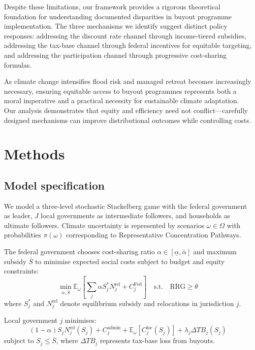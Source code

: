 \documentclass[11pt,letterpaper]{article}
\theoremstyle{definition}
\newcommand{\E}{\mathbb{E}}
\begin{document}
Despite these limitations, our framework provides a rigorous theoretical foundation for understanding documented disparities in buyout programme implementation. The three mechanisms we identify suggest distinct policy responses: addressing the discount rate channel through income-tiered subsidies, addressing the tax-base channel through federal incentives for equitable targeting, and addressing the participation channel through progressive cost-sharing formulas.

As climate change intensifies flood risk and managed retreat becomes increasingly necessary, ensuring equitable access to buyout programmes represents both a moral imperative and a practical necessity for sustainable climate adaptation. Our analysis demonstrates that equity and efficiency need not conflict---carefully designed mechanisms can improve distributional outcomes while controlling costs.

\section*{Methods}

\subsection*{Model specification}

We model a three-level stochastic Stackelberg game with the federal government as leader, $J$ local governments as intermediate followers, and households as ultimate followers. Climate uncertainty is represented by scenarios $\omega \in \Omega$ with probabilities $\pi(\omega)$ corresponding to Representative Concentration Pathways.

The federal government chooses cost-sharing ratio $\alpha \in [\underline{\alpha}, \bar{\alpha}]$ and maximum subsidy $\bar{S}$ to minimise expected social costs subject to budget and equity constraints:
\begin{equation}
\min_{\alpha, \bar{S}} \E_\omega\left[\sum_{j} \alpha S_j^* N_j^{\text{rel}} + C_j^{\text{Fed}}\right] \quad \text{s.t.} \quad \text{RRG} \geq \theta
\end{equation}
where $S_j^*$ and $N_j^{\text{rel}}$ denote equilibrium subsidy and relocations in jurisdiction $j$.

Local government $j$ minimises:
\begin{equation}
(1-\alpha) S_j N_j^{\text{rel}}(S_j) + C_j^{\text{admin}} + \E_\omega[C_j^{\text{loc}}(S_j)] + \lambda_j \Delta TB_j(S_j)
\end{equation}
subject to $S_j \leq \bar{S}$, where $\Delta TB_j$ represents tax-base loss from buyouts.
\end{document}
